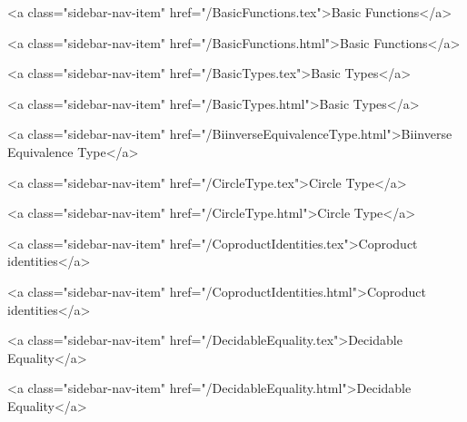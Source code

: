      
    
      
        
          <a class="sidebar-nav-item" href="/BasicFunctions.tex">Basic Functions</a>
        
      
    
      
        
          <a class="sidebar-nav-item" href="/BasicFunctions.html">Basic Functions</a>
        
      
    
      
        
          <a class="sidebar-nav-item" href="/BasicTypes.tex">Basic Types</a>
        
      
    
      
        
          <a class="sidebar-nav-item" href="/BasicTypes.html">Basic Types</a>
        
      
    
      
        
          <a class="sidebar-nav-item" href="/BiinverseEquivalenceType.html">Biinverse Equivalence Type</a>
        
      
    
      
        
          <a class="sidebar-nav-item" href="/CircleType.tex">Circle Type</a>
        
      
    
      
        
          <a class="sidebar-nav-item" href="/CircleType.html">Circle Type</a>
        
      
    
      
        
          <a class="sidebar-nav-item" href="/CoproductIdentities.tex">Coproduct identities</a>
        
      
    
      
        
          <a class="sidebar-nav-item" href="/CoproductIdentities.html">Coproduct identities</a>
        
      
    
      
        
          <a class="sidebar-nav-item" href="/DecidableEquality.tex">Decidable Equality</a>
        
      
    
      
        
          <a class="sidebar-nav-item" href="/DecidableEquality.html">Decidable Equality</a>
        
